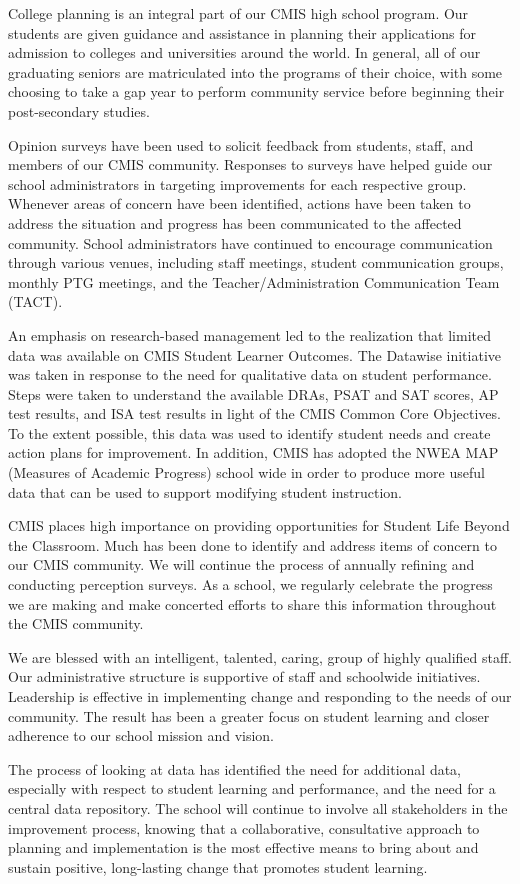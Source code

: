 College planning is an integral part of our CMIS high school program. Our students are given guidance and assistance in planning their applications for admission to colleges and universities around the world. In general, all of our graduating seniors are matriculated into the programs of their choice, with some choosing to take a gap year to perform community service before beginning their post-secondary studies. 

Opinion surveys have been used to solicit feedback from students, staff, and members of our CMIS community. Responses to surveys have helped guide our school administrators in targeting improvements for each respective group. Whenever areas of concern have been identified, actions have been taken to address the situation and progress has been communicated to the affected community. School administrators have continued to encourage communication through various venues, including staff meetings, student communication groups, monthly PTG meetings, and the Teacher/Administration Communication Team (TACT). 

An emphasis on research-based management led to the realization that limited data was available on CMIS Student Learner Outcomes. The Datawise initiative was taken in response to the need for qualitative data on student performance. Steps were taken to understand the available DRAs, PSAT and SAT scores, AP test results, and ISA test results in light of the CMIS Common Core Objectives. To the extent possible, this data was used to identify student needs and create action plans for improvement. In addition, CMIS has adopted the NWEA MAP (Measures of Academic Progress) school wide in order to produce more useful data that can be used to support modifying student instruction.  

CMIS places high importance on providing opportunities for Student Life Beyond the Classroom. Much has been done to identify and address items of concern to our CMIS community. We will continue the process of annually refining and conducting perception surveys. As a school, we regularly celebrate the progress we are making and make concerted efforts to share this information throughout the CMIS community. 

We are blessed with an intelligent, talented, caring, group of highly qualified staff. Our administrative structure is supportive of staff and schoolwide initiatives. Leadership is effective in implementing change and responding to the needs of our community. The result has been a greater focus on student learning and closer adherence to our school mission and vision. 

The process of looking at data has identified the need for additional data, especially with respect to student learning and performance, and the need for a central data repository. The school will continue to involve all stakeholders in the improvement process, knowing that a collaborative, consultative approach to planning and implementation is the most effective means to bring about and sustain positive, long-lasting change that promotes student learning. 
